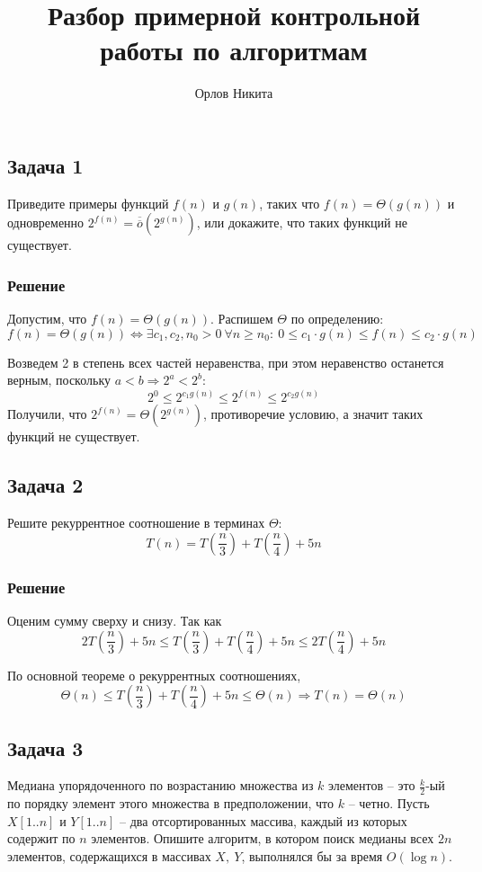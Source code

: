 \documentclass[a4letter,12pt]{article}
\newcommand{\doverline}[1]{\overline{\overline{#1}}}
\begin{document}
	\title{Разбор примерной контрольной работы по алгоритмам}
	\author{Орлов Никита}
	\maketitle
	
	\subsection*{Задача 1}	
	Приведите примеры функций $f(n)$ и $g(n)$, таких что $f(n) = \Theta(g(n))$ и одновременно $2^{f(n)} = \doverline{o}(2^{g(n)})$, или докажите, что таких функций не существует.
	
	\subsubsection*{Решение}
	Допустим, что $f(n) = \Theta(g(n))$. Распишем $\Theta$ по определению:
	\[
	f(n) = \Theta(g(n))
	\Leftrightarrow
	\exists c_1, c_2,n_0 > 0 \ \forall n\geqslant n_0: \
	0\leqslant c_1\cdot g(n)\leqslant f(n) \leqslant c_2 \cdot g(n)
	\]
	
	Возведем 2 в степень всех частей неравенства, при этом неравенство останется верным, поскольку $a < b \Rightarrow 2^a < 2^b$:
	\[
	2^0 \leqslant 2^{c_1g(n)} \leqslant 2^{f(n)} \leqslant 2^{c_2g(n)}
	\]
	Получили, что $2^{f(n)} = \Theta(2^{g(n)})$, противоречие условию, а значит таких функций не существует.
	
	\subsection*{Задача 2}
	
	Решите рекуррентное соотношение в терминах $\Theta$:
	\[
	T(n) = T\left(\frac n3\right) + T\left(\frac n4\right) + 5n
	\]
	
	\subsubsection*{Решение}
	Оценим сумму сверху и снизу. Так как
	\[
	2T\left(\frac n3\right)+5n \leqslant  T\left(\frac n3\right) + T\left(\frac n4\right) + 5n \leqslant 2T\left(\frac n4\right) + 5n
	\]
	
	По основной теореме о рекуррентных соотношениях,
	\[
	\Theta(n) \leqslant T\left(\frac n3\right) + T\left(\frac n4\right) + 5n \leqslant \Theta(n) \Rightarrow T(n) = \Theta(n)
	\]
	\subsection*{Задача 3}
	Медиана упорядоченного по возрастанию множества из $k$ элементов -- это $\frac k2$-ый по порядку элемент этого множества в предположении, что $k$ -- четно. Пусть $X[1..n]$ и $Y[1..n]$ -- два отсортированных массива, каждый из которых содержит по $n$ элементов. Опишите алгоритм, в котором поиск медианы всех $2n$ элементов, содержащихся в массивах $X, \ Y$, выполнялся бы за время $O(\log n)$.
	
\end{document}
